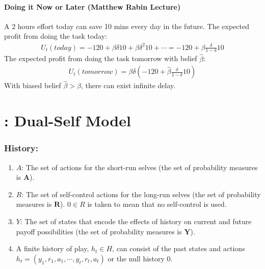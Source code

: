 \documentclass[11pt]{elegantbook}
\begin{document}
\paragraph*{Doing it Now or Later (Matthew Rabin Lecture)}
A 2 hours effort today can save 10 mins every day in the future. The expected profit from doing the task today:
\begin{equation}
    \begin{aligned}
        U_t(today)=-120+\beta \delta 10 + \beta \delta^2 10 + \cdots=-120+\beta\frac{\delta}{1-\delta}10
    \end{aligned}
    \nonumber
\end{equation}
The expected profit from doing the task tomorrow with belief $\hat{\beta}$:
\begin{equation}
    \begin{aligned}
        U_t(tomorrow)=\beta\delta\left(-120+\hat{\beta}\frac{\delta}{1-\delta}10\right)
    \end{aligned}
    \nonumber
\end{equation}
With biased belief $\hat{\beta}>\beta$, there can exist infinite delay.



\section{\cite{fudenberg2006dual}: Dual-Self Model}
\subsubsection*{History:}
\begin{enumerate}
    \item $A$: The set of actions for the short-run selves (the set of probability measures is $\mathbf{A}$).
    \item $R$: The set of self-control actions for the long-run selves (the set of probability measures is $\mathbf{R}$). $0\in R$ is taken to mean that no self-control is used.
    \item $Y$: The set of states that encode the effects of history on current and future payoff possibilities (the set of probability measures is $\mathbf{Y}$).
    \item A finite history of play, $h_t\in H$, can consist of the past states and actions $h_t=(y_1,r_1,a_1,\cdots,y_t,r_t,a_t)$ or the null history $0$.
\end{enumerate}
\end{document}

